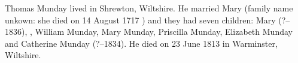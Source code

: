 
Thomas Munday lived in Shrewton, Wiltshire.  He married Mary (family name unkown: she died on 14 August 1717 \cite{ThomasMundayDeath}) and they had seven children: Mary (?--1836), , William Munday, Mary Munday, Priscilla Munday, Elizabeth Munday and Catherine Munday (?--1834). He died on 23 June 1813 in Warminster, Wiltshire.\cite{ThomasMundayDeath}
